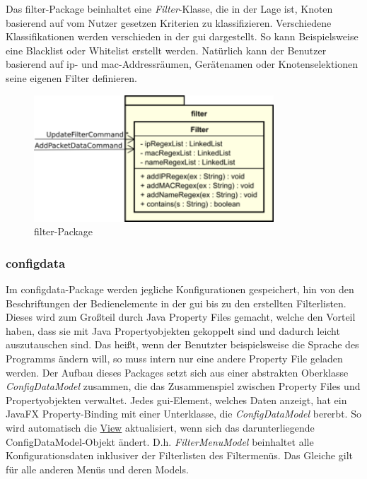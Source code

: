     Das filter-Package beinhaltet eine \textit{Filter}-Klasse, die in der Lage ist,
    Knoten basierend auf vom Nutzer gesetzen Kriterien zu klassifizieren. Verschiedene
    Klassifikationen werden verschieden in der \gls{gui} dargestellt. So kann
    Beispielsweise eine Blacklist oder Whitelist erstellt werden.
    Natürlich kann der Benutzer basierend auf \gls{ip}- und \gls{mac}-Addressräumen,
    Gerätenamen oder Knotenselektionen seine eigenen Filter definieren.
    
    \begin{figure}[H]
      \centering
      \includegraphics[width=0.8\textwidth]{../diagramimages/filter.png}
      \caption{filter-Package}
    \end{figure}

    \subsubsection{configdata}
    \label{subsubsec:configdata}

    Im configdata-Package werden jegliche Konfigurationen gespeichert, hin von den
    Beschriftungen der Bedienelemente in der \gls{gui} bis zu den erstellten Filterlisten. Dieses
    wird zum Großteil durch Java Property Files gemacht, welche den Vorteil haben, dass
    sie mit Java Propertyobjekten gekoppelt sind und dadurch leicht auszutauschen sind.
    Das heißt, wenn der Benutzter beispielsweise die Sprache des Programms ändern
    will, so muss intern nur eine andere Property File geladen werden.
    \newline
    \newline
    Der Aufbau dieses Packages setzt sich aus einer abstrakten Oberklasse
    \textit{ConfigDataModel} zusammen, die das Zusammenspiel zwischen Property Files
    und Propertyobjekten verwaltet. Jedes \gls{gui}-Element, welches Daten anzeigt, hat
    ein JavaFX Property-Binding mit einer Unterklasse, die \textit{ConfigDataModel}
    bererbt. So wird automatisch die \hyperref[subsec:view]{View} aktualisiert,
    wenn sich das darunterliegende ConfigDataModel-Objekt ändert. D.h.
    \textit{FilterMenuModel} beinhaltet alle Konfigurationsdaten inklusiver der
    Filterlisten des Filtermenüs. Das Gleiche gilt für alle anderen Menüs und
    deren Models.
    

